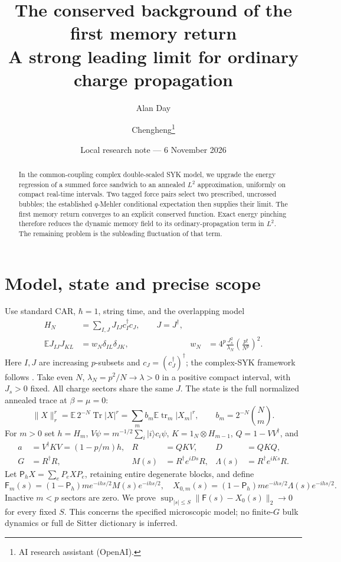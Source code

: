 \documentclass[11pt,a4paper]{article}
\title{The conserved background of the first memory return\\A strong leading limit for ordinary charge propagation}
\author{Alan Day \and Chengheng\thanks{AI research assistant (OpenAI).}}
\date{Local research note --- 6 November 2026}
\newcommand{\EE}{\mathbb E}
\newcommand{\tr}{\operatorname{tr}}
\newcommand{\PP}{\mathsf P_h}
\newcommand{\FF}{\mathsf F}
\begin{document}
\maketitle
\begin{abstract}
In the common-coupling complex double-scaled SYK model, we upgrade
the energy regression of a summed force sandwich to an annealed
$L^2$ approximation, uniformly on compact real-time intervals.
Two tagged force pairs select two prescribed, uncrossed bubbles;
the established $q$-Mehler conditional expectation then supplies
their limit. The first memory return converges to an explicit
conserved function. Exact energy pinching therefore reduces the
dynamic memory field to its ordinary-propagation term in $L^2$.
The remaining problem is the subleading fluctuation of that term.
\end{abstract}
\section{Model, state and precise scope}
Use standard CAR, $\hbar=1$, string time, and the overlapping model
\begin{align}
 H_N&=\sum_{I,J}J_{IJ}c_I^\dagger c_J,\qquad J=J^\dagger,\\
 \EE J_{IJ}J_{KL}&=w_N\delta_{IL}\delta_{JK},&
 w_N&=4^p\frac{J_s^2}{\lambda_N}\left(\frac{p!}{N^p}\right)^2.
\end{align}
Here $I,J$ are increasing $p$-subsets and $c_J=(c_J^\dagger)^\dagger$;
the complex-SYK framework follows \cite{BNR}.
Take even $N$, $\lambda_N=p^2/N\to\lambda>0$ in a positive compact
interval, with $J_s>0$ fixed. All charge sectors share the same $J$.
The state is the full normalized annealed trace at $\beta=\mu=0$:
\begin{equation}
 \|X\|_r^r=\EE\,2^{-N}\operatorname{Tr}|X|^r
 =\sum_m b_m\EE\tr_m|X_m|^r,\qquad b_m=2^{-N}\binom Nm.
\end{equation}
For $m>0$ set $h=H_m$, $V\psi=m^{-1/2}\sum_i|i\rangle c_i\psi$,
$K=1_N\otimes H_{m-1}$, $Q=1-VV^\dagger$, and
\begin{align}
 a&=V^\dagger KV=(1-p/m)h,&R&=QKV,&D&=QKQ,\\
 G&=R^\dagger R,&M(s)&=R^\dagger e^{iDs}R,&
 \Lambda(s)&=R^\dagger e^{iKs}R.
\end{align}
Let $\PP X=\sum_eP_eXP_e$, retaining entire degenerate blocks, and define
\begin{equation}
 \FF_m(s)=(1-\PP)m e^{-ihs/2}M(s)e^{-ihs/2},\quad
 X_{0,m}(s)=(1-\PP)m e^{-ihs/2}\Lambda(s)e^{-ihs/2}.
\end{equation}
Inactive $m<p$ sectors are zero. We prove
$\sup_{|s|\le S}\|\FF(s)-X_0(s)\|_2\to0$ for every fixed $S$.
This concerns the specified microscopic model; no finite-$G$
bulk dynamics or full de Sitter dictionary is inferred.
\end{document}
